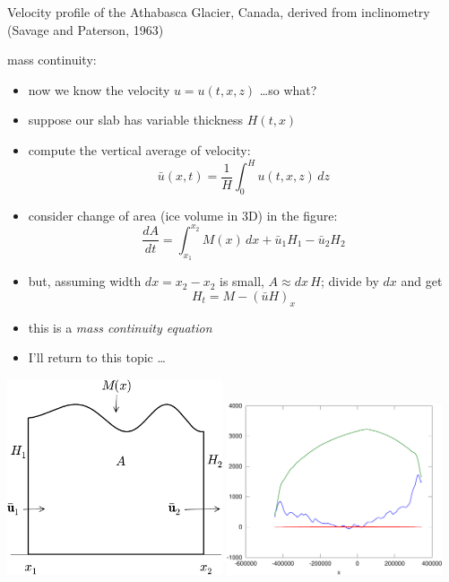 \documentclass[titlepage,letterpaper,final,11pt]{scrartcl}
\begin{document}
Velocity profile of the Athabasca Glacier, Canada, derived from inclinometry (Savage and Paterson, 1963)\nocite{SavagePaterson}


mass continuity:

\begin{itemize}
\item now we know the velocity $u=u(t,x,z)$ \dots so what?
\item suppose our slab has variable thickness $H(t,x)$
\item compute the vertical average of velocity:
	$$\bar u(x,t) = \frac{1}{H}\int_0^{H} u(t,x,z)\,dz$$
\end{itemize}

\begin{itemize}
\item consider change of area (ice volume in 3D) in the figure:
	$$\frac{dA}{dt} = \int_{x_1}^{x_2} M(x)\,dx + \bar u_1 H_1 - \bar u_2 H_2$$
\item but, assuming width $dx=x_2-x_2$ is small, $A\approx dx\, H$; divide by $dx$ and get
   $$H_t = M - \left(\bar u H\right)_x$$
\item this is a \emph{mass continuity equation}
\item I'll return to this topic \dots
\end{itemize}

\begin{center}
\includegraphics[width=2.5in]{slabmasscontfig}
\quad
\includegraphics[width=2.5in]{green_transect}
\end{center}
\end{document}
